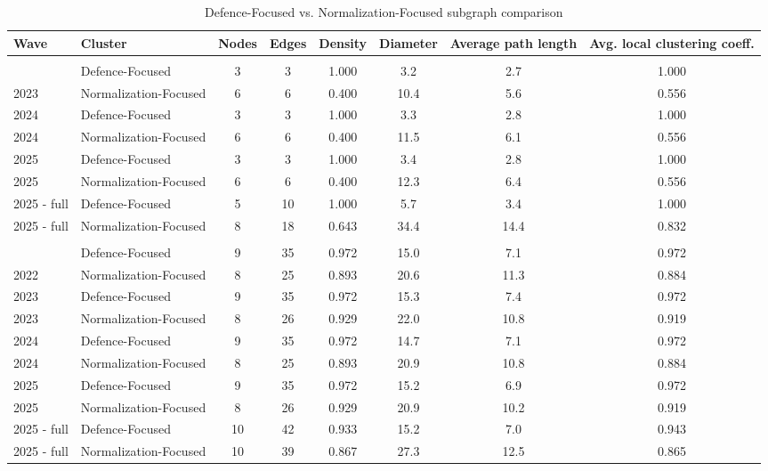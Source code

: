 \begin{table}[t]
\caption*{
{\fontsize{20}{25}\selectfont  Defence-Focused vs. Normalization-Focused subgraph comparison\fontsize{10}{12}\selectfont }
} 
\fontsize{10.0pt}{12.0pt}\selectfont
\begin{tabular*}{\linewidth}{@{\extracolsep{\fill}}llcccccc}
\toprule
{\bfseries Wave} & {\bfseries Cluster} & {\bfseries Nodes} & {\bfseries Edges} & {\bfseries Density} & {\bfseries Diameter} & {\bfseries Average path length} & {\bfseries Avg. local clustering coeff.} \\ 
\midrule\addlinespace[2.5pt]
\multicolumn{8}{l}{Horizontal coherence} \\[2.5pt] 
\midrule\addlinespace[2.5pt]
2023 & Defence-Focused & 3 & 3 & 1.000 & 3.2 & 2.7 & 1.000 \\ 
2023 & Normalization-Focused & 6 & 6 & 0.400 & 10.4 & 5.6 & 0.556 \\ 
2024 & Defence-Focused & 3 & 3 & 1.000 & 3.3 & 2.8 & 1.000 \\ 
2024 & Normalization-Focused & 6 & 6 & 0.400 & 11.5 & 6.1 & 0.556 \\ 
2025 & Defence-Focused & 3 & 3 & 1.000 & 3.4 & 2.8 & 1.000 \\ 
2025 & Normalization-Focused & 6 & 6 & 0.400 & 12.3 & 6.4 & 0.556 \\ 
2025 - full & Defence-Focused & 5 & 10 & 1.000 & 5.7 & 3.4 & 1.000 \\ 
2025 - full & Normalization-Focused & 8 & 18 & 0.643 & 34.4 & 14.4 & 0.832 \\ 
\midrule\addlinespace[2.5pt]
\multicolumn{8}{l}{Vertical extension} \\[2.5pt] 
\midrule\addlinespace[2.5pt]
2022 & Defence-Focused & 9 & 35 & 0.972 & 15.0 & 7.1 & 0.972 \\ 
2022 & Normalization-Focused & 8 & 25 & 0.893 & 20.6 & 11.3 & 0.884 \\ 
2023 & Defence-Focused & 9 & 35 & 0.972 & 15.3 & 7.4 & 0.972 \\ 
2023 & Normalization-Focused & 8 & 26 & 0.929 & 22.0 & 10.8 & 0.919 \\ 
2024 & Defence-Focused & 9 & 35 & 0.972 & 14.7 & 7.1 & 0.972 \\ 
2024 & Normalization-Focused & 8 & 25 & 0.893 & 20.9 & 10.8 & 0.884 \\ 
2025 & Defence-Focused & 9 & 35 & 0.972 & 15.2 & 6.9 & 0.972 \\ 
2025 & Normalization-Focused & 8 & 26 & 0.929 & 20.9 & 10.2 & 0.919 \\ 
2025 - full & Defence-Focused & 10 & 42 & 0.933 & 15.2 & 7.0 & 0.943 \\ 
2025 - full & Normalization-Focused & 10 & 39 & 0.867 & 27.3 & 12.5 & 0.865 \\ 
\bottomrule
\end{tabular*}
\end{table}


